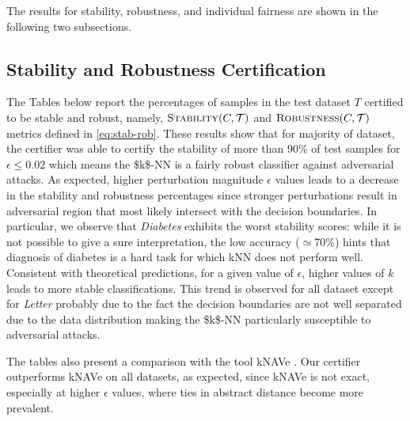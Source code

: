 The results for stability, robustness, and individual fairness are shown in the following two subsections.

\subsection{Stability and Robustness Certification}

The Tables below report the percentages of samples in the test dataset $T$ certified to be stable and robust, namely, $\textsc{Stability}(C, \mathcal{T})$ and $\textsc{Robustness}(C, \mathcal{T})$ metrics defined in \eqref{eq:stab-rob}. These results show that for majority of dataset, the certifier was able to certify the stability of more than $90\%$ of test samples for $\epsilon \leq 0.02$ which means the \acs{$k$-NN} is a fairly robust classifier against adversarial attacks. As expected, higher perturbation magnitude $\epsilon$ values leads to a decrease in the stability and robustness percentages since stronger perturbations result in adversarial region that most likely intersect with the decision boundaries. In particular, we observe that \textit{Diabetes} exhibits the worst stability scores: while it is not possible to give a sure interpretation, the low accuracy ($\simeq  70\%$) hints that diagnosis of diabetes is a hard task for which kNN does not perform well. Consistent with theoretical predictions, for a given value of $\epsilon$, higher values of $k$ leads to more stable classifications. This trend is observed for all dataset except for \textit{Letter} probably due to the fact the decision boundaries are not well separated due to the data distribution making the \acs{$k$-NN} particularly susceptible to adversarial attacks.

The tables also present a comparison with the tool kNAVe \cite{Nicolo-knn}. Our certifier outperforms kNAVe on all datasets, as expected, since kNAVe is not exact, especially at higher $\epsilon$ values, where ties in abstract distance become more prevalent.

\vspace{10pt}

